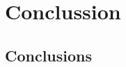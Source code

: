\doublespacing %

\chapter{Conclussion}
\label{ch5}

\begin{spacing}{1} %
\minitoc %
\end{spacing} %
\thesisspacing %


\section{Conclusions}



